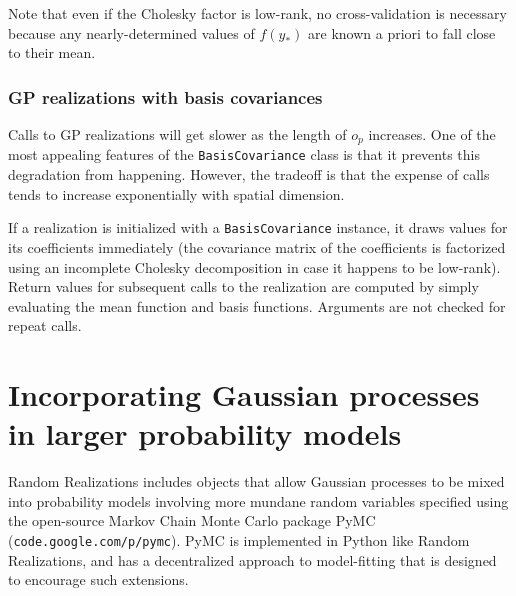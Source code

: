 \documentclass{report}
\begin{document}
Note that even if the Cholesky factor is low-rank, no cross-validation is necessary because any nearly-determined values of $f(y_*)$ are known a priori to fall close to their mean.

\subsection{GP realizations with basis covariances}
Calls to GP realizations will get slower as the length of $o_p$ increases. One of the most appealing features of the \texttt{BasisCovariance} class is that it prevents this degradation from happening. However, the tradeoff is that the expense of calls tends to increase exponentially with spatial dimension.

If a realization is initialized with a \texttt{BasisCovariance} instance, it draws values for its coefficients immediately (the covariance matrix of the coefficients is factorized using an incomplete Cholesky decomposition in case it happens to be low-rank). Return values for subsequent calls to the realization are computed by simply evaluating the mean function and basis functions. Arguments are not checked for repeat calls.

\chapter{Incorporating Gaussian processes in larger probability models}\label{sec:PyMC}

Random Realizations includes objects that allow Gaussian processes to be mixed into probability models involving more mundane random variables specified using the open-source Markov Chain Monte Carlo package PyMC (\texttt{code.google.com/p/pymc}). PyMC is implemented in Python like Random Realizations, and has a decentralized approach to model-fitting that is designed to encourage such extensions.
\end{document}
